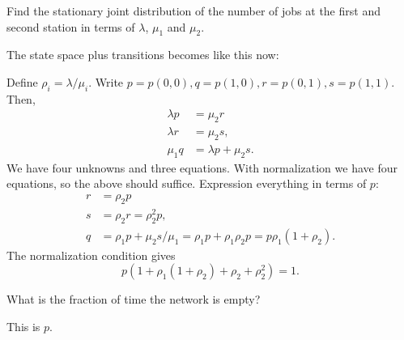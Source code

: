 \begin{exercise}[201706]
 Find the stationary joint distribution of the number of jobs at the first
 and second station in terms of $\lambda$, $\mu_1$ and $\mu_2$.
\begin{solution}
The state space plus transitions becomes like this now:



Define $\rho_i=\lambda/\mu_i$. Write $p=p(0,0), q=p(1,0), r=p(0,1), s=p(1,1)$. Then,
 \begin{align*}
 \lambda p &= \mu_2 r \\
 \lambda r &= \mu_2 s,\\
 \mu_1 q &= \lambda p + \mu_2 s.
 \end{align*}
We have four unknowns and three equations. With normalization we have four equations, so the above should suffice. Expression everything in terms of $p$: 
 \begin{align*}
 r &= \rho_2 p \\
 s &= \rho_2 r = \rho_2^2 p,\\
 q &= \rho_1 p + \mu_2 s/\mu_1 = \rho_1 p + \rho_1\rho_2 p = p \rho_1 (1+\rho_2).
 \end{align*}
The normalization condition gives
\begin{equation*}
 p(1+\rho_1(1+\rho_2) + \rho_2 + \rho_2^2) = 1.
\end{equation*}

\end{solution}
\end{exercise}

\begin{exercise}[201706]
What is the fraction of time the network is empty? %
\begin{solution}
This is $p$. 
\end{solution}
\end{exercise}

